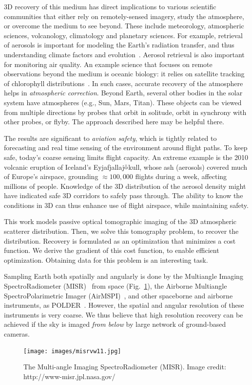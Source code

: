 \documentclass[10pt,twocolumn,letterpaper]{article}
\begin{document}
3D recovery of this medium has direct implications to various scientific communities that either rely on remotely-sensed imagery, study the atmosphere, or overcome the medium to see beyond. These include meteorology, atmospheric sciences, volcanology, climatology and planetary sciences. For example, retrieval of aerosols %
is important for modeling the Earth's radiation transfer, and thus understanding climate factors and evolution~\cite{chud,dayan,kalashnikova}. Aerosol retrieval is also important for monitoring air quality. An example science that focuses on remote observations beyond the medium is oceanic biology: it relies on satellite tracking of chlorophyll distributions~\cite{chang,johnsen,levy,moses}. In such cases, accurate recovery of the atmosphere helps in {\em atmospheric correction}. Beyond Earth, several other bodies in the solar system have atmospheres (e.g., Sun, Mars, Titan). These objects can be viewed from multiple directions by probes that orbit in solitude, orbit in synchrony with other probes, or flyby. The approach described here may be helpful there.

The results are significant to {\em aviation safety}, which is tightly related to forecasting and real time sensing of the environment around flight
paths. To keep safe, today's coarse sensing limits flight capacity. An extreme example is the 2010 volcanic eruption of Iceland's
Eyjafjallaj$\ddot {\rm o}$kull, whose ash (aerosols) covered much of Europe's airspace, grounding $\approx 100,000$ flights during a week, affecting millions of people. Knowledge of the 3D distribution of the aerosol density might have indicated safe 3D corridors to safely pass through.
The ability to know the conditions in 3D can thus enhance use of flight airspace, while maintaining safety.


This work models passive optical tomographic imaging of the 3D atmospheric scatterer distribution. Then, we solve this tomography problem, to recover the distribution. Recovery is formulated as an optimization that minimizes a cost function. We derive the gradient of this cost function, to enable efficient optimization. Obtaining data for this problem is an interesting task.

Sampling Earth both spatially and angularly is done by the Multiangle Imaging SpectroRadiometer (MISR)~\cite{diner,matronchik} from space (Fig.~\ref{fig:orbit}), the Airborne Multiangle SpectroPolarimetric Imager (AirMSPI)~\cite{dinerDavis07,dinerDavis10}, and other spaceborne and airborne instruments, as POLDER~\cite{baxter,breon,vanMol}. However, the spatial and angular resolution of these instruments is very coarse. We thus believe that high resolution recovery can be achieved if the sky is imaged {\em from below} by large network of ground-based cameras.
\begin{figure}[htbp]
  \centering
  \texttt{[image: images/misrvw11.jpg]}
  \caption{The Multi-angle Imaging SpectroRadiometer (MISR). Image credit: http://www-misr.jpl.nasa.gov/}
  \label{fig:orbit}
\end{figure}
\end{document}
